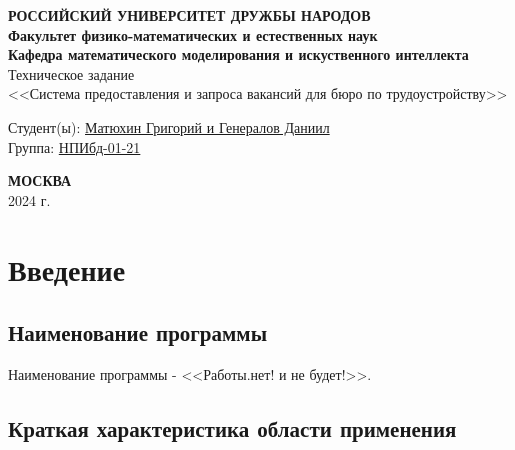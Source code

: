 \documentclass[a4page]{article}
\begin{document}
\begin{titlepage}

\begin{center}
\hfill \break
\textbf{
\large{РОССИЙСКИЙ УНИВЕРСИТЕТ ДРУЖБЫ НАРОДОВ}\\
\normalsize{Факультет физико-математических и естественных наук}\\ 
\normalsize{Кафедра математического моделирования и искуственного интеллекта}\\
}
\vspace*{\fill}
\Large{Техническое задание\\ \Large<<Система предоставления и запроса вакансий для бюро по трудоустройству>>}
\vspace*{\fill}

\end{center}
 
 \begin{flushright}
 Студент(ы): \underline{Матюхин Григорий и Генералов Даниил}\\ \vspace{0.5cm}
 Группа: \underline{НПИбд-01-21}
 \end{flushright}
 
 
\begin{center} \textbf{МОСКВА} \\ 2024 г. \end{center}
\thispagestyle{empty} %

\end{titlepage}

\newpage

\tableofcontents

\newpage

\section{Введение}

\subsection{Наименование программы}

Наименование программы - <<Работы.нет! и не будет!>>.

\subsection{Краткая характеристика области применения}
\end{document}
